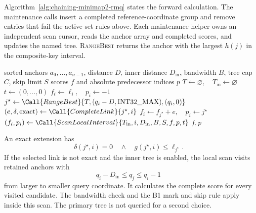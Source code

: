 Algorithm~\ref{alg:chaining-minimap2-rmq} states the forward calculation.  The
maintenance calls insert a completed reference-coordinate group and remove
entries that fail the active-set rules above.  Each maintenance helper owns
an independent scan cursor, reads the anchor array and completed scores, and
updates the named tree.  \textsc{RangeBest} returns the anchor with the largest
\(h(j)\) in the composite-key interval.

\begin{algorithm}[H]
\caption{Minimap2 RMQ forward chaining}
\label{alg:chaining-minimap2-rmq}
\footnotesize
\begin{algorithmic}[1]
  \Require sorted anchors \(a_0,\ldots,a_{n-1}\), distance \(D\),
    inner distance \(D_{\mathrm{in}}\), bandwidth \(B\), tree cap \(C\),
    skip limit \(S\)
  \Ensure scores \(f\) and absolute predecessor indices \(p\)
    \State \(T\gets\varnothing,\quad T_{\mathrm{in}}\gets\varnothing\)
    \State \(t\gets(0,\ldots,0)\)
      \State {}
        \State {}
      \EndIf
      \State {}
        \State {}
      \EndIf
      \State \(f_i\gets\ell_i,\quad p_i\gets-1\)
      \State \(j^\star\gets
        \Call{RangeBest}{T,(q_i-D,\mathrm{INT32\_MAX}),(q_i,0)}\)
        \State \((e,\delta,\mathrm{exact})\gets
          \Call{CompleteLink}{j^\star,i}\)
          \State \(f_i\gets f_{j^\star}+e,\quad p_i\gets j^\star\)
        \EndIf
          \State \((f_i,p_i)\gets
            \Call{ScanLocalInterval}{T_{\mathrm{in}},i,D_{\mathrm{in}},B,S,f,p,t}\)
        \EndIf
      \EndIf
    \EndFor
    \State \Return \(f,p\)
  \EndFunction
\end{algorithmic}
\end{algorithm}

An exact extension has
\[
  \delta(j^\star,i)=0
  \quad\land\quad
  g(j^\star,i)\leq\ell_{j^\star}.
\]
If the selected link is not exact and the inner tree is enabled, the local
scan visits retained anchors with
\[
  q_i-D_{\mathrm{in}}\leq q_j\leq q_i-1
\]
from larger to smaller query coordinate.  It calculates the complete score
for every visited candidate.  The bandwidth check and the B1 mark and skip
rule apply inside this scan.  The primary tree is not queried for a second
choice.

